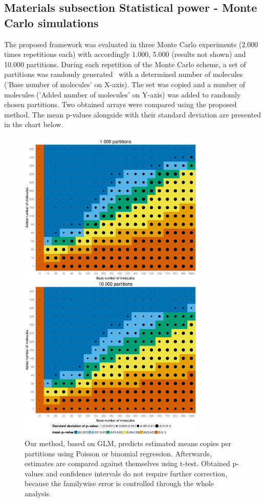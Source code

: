 \documentclass[a4,center,fleqn]{NAR}
\begin{document}
\subsection{Materials subsection Statistical power - Monte Carlo simulations}

The proposed framework was evaluated in three Monte Carlo experiments (2.000 times repetitions each) with accordingly 1.000, 5.000 (results not shown) and 10.000 partitions. During each repetition of the Monte Carlo scheme, a set of partitions was randomly generated~\cite{dube_mathematical_2008} with a determined number of molecules ('Base number of molecules' on X-axis). The set was copied and a number of molecules ('Added number of molecules' on Y-axis) was added to randomly chosen partitions. Two obtained arrays were compared using the proposed method. The mean p-values alongside with their standard deviation are presented in the chart below.

\begin{figure}[t]
\begin{center}
\includegraphics[width=9cm]{mc_figures-1.pdf}
\end{center}
\caption{Our method, based on GLM, predicts estimated means copies per partitions using Poisson or binomial regression. Afterwards, estimates are compared against themselves using t-test. Obtained p-values and confidence intervals do not require further correction, because the familywise error is controlled through the whole analysis.}
\label{mc_figures-1}
\end{figure}
\end{document}
